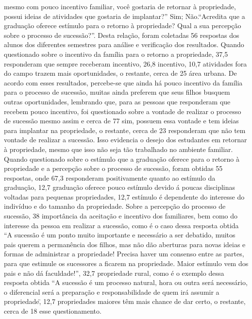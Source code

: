 mesmo com pouco incentivo familiar, você gostaria de retornar à propriedade, possui ideias de 
atividades que gostaria de implantar?” Sim; Não.“Acredita que a graduação oferece estímulo para 
o retorno à propriedade? Qual a sua percepção sobre o processo de sucessão?”. Desta relação, 
foram coletadas 56 respostas dos alunos dos diferentes semestres para análise e verificação dos 
resultados.
Quando questionado sobre o incentivo da família para o retorno a propriedade, 37,5%
responderam que sempre receberam incentivo, 26,8%
incentivo, 10,7%
atividades fora do campo trazem mais oportunidades, o restante, cerca de 25%
área urbana. De acordo com esses resultados, percebe-se que ainda há pouco incentivo da família 
para o processo de sucessão, muitas ainda preferem que seus filhos busquem outras oportunidades, 
lembrando que, para as pessoas que responderam que recebem pouco incentivo, foi questionado 
sobre a vontade de realizar o processo de sucessão mesmo assim e cerca de 77%
sim, possuem essa vontade e tem ideias para implantar na propriedade, o restante, cerca de 23%
responderam que não tem vontade de realizar a sucessão. Isso evidencia o desejo dos estudantes 
em retornar à propriedade, mesmo que isso não seja tão trabalhado no ambiente familiar. 
Quando questionado sobre o estímulo que a graduação oferece para o retorno à propriedade 
e a percepção sobre o processo de sucessão, foram obtidas 55 respostas, onde 67,3%
responderam positivamente quanto ao estímulo da graduação, 12,7%
graduação oferece pouco estímulo devido á poucas disciplinas voltadas para pequenas 
propriedades, 12,7%
estímulo é dependente do interesse do indivíduo e do tamanho da propriedade. 
Sobre a percepção do processo de sucessão, 38%
importância da aceitação e incentivo dos familiares, bem como do interesse da pessoa em realizar 
a sucessão, como é o caso dessa resposta obtida “A sucessão é um ponto muito importante e 
necessário a ser debatido, muitos pais querem a permanência dos filhos, mas não dão aberturas 
para novas ideias e formas de administrar a propriedade! Precisa haver um consenso entre as 
partes, para que estimule os sucessores a ficarem na propriedade. Maior estímulo vem dos pais e 
não dá faculdade!”, 32,7%
propriedade rural, como é o exemplo dessa resposta obtida “A sucessão é um processo natural, 
hora ou outra será necessário, o diferencial será a preparação e responsabilidade de quem irá 
assumir a propriedade\", 12,7%
propriedades maiores têm mais chance de dar certo, o restante, cerca de 18%
esse questionamento.

